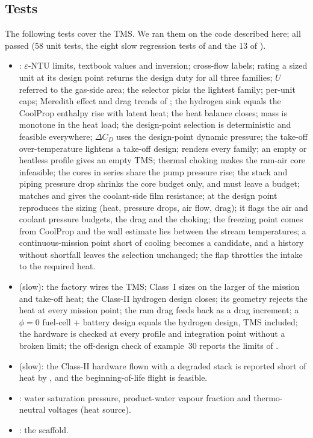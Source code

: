\documentclass[a4paper,11pt]{article}
\begin{document}
\subsection{Tests}
The following tests cover the TMS. We ran them on the code described here; all passed
(58 unit tests, the eight slow regression tests of  and the 13
of ).
\begin{itemize}
\item {}: $\varepsilon$-NTU limits, textbook values
  and inversion; cross-flow labels; rating a sized unit at its design point returns the
  design duty for all three families; $U$ referred to the gas-side area; the selector
  picks the lightest family; per-unit caps; Meredith effect and drag trends of
  ; the hydrogen sink equals the CoolProp enthalpy rise with latent
  heat; the heat balance closes; mass is monotone in the heat load; the design-point
  selection is deterministic and feasible everywhere; $\Delta C_D$ uses the design-point
  dynamic pressure; the take-off over-temperature lightens a take-off design;
   renders every family; an empty or heatless profile gives an empty TMS;
  thermal choking makes the ram-air core infeasible; the cores in series share the pump
  pressure rise; the stack and piping pressure drop shrinks the core budget only, and must
  leave a budget;  matches  and gives the coolant-side
  film resistance;  at the design point reproduces the sizing (heat,
  pressure drops, air flow, drag); it flags the air and coolant pressure budgets, the drag
  and the choking; the freezing point comes from CoolProp and the wall estimate lies between
  the stream temperatures; a continuous-mission point short of cooling becomes a candidate,
  and a history without shortfall leaves the selection unchanged; the flap throttles the
  intake to the required heat.
\item {} (slow): the factory wires the TMS; Class~I
  sizes on the larger of the mission and take-off heat; the Class-II hydrogen design
  closes; its geometry rejects the heat at every mission point; the ram drag feeds back as a
  drag increment; a $\phi = 0$ fuel-cell + battery design equals the hydrogen design, TMS
  included; the hardware is checked at every profile and integration point without a broken
  limit; the off-design check of example~30 reports the limits of .
\item {} (slow): the Class-II hardware flown with a
  degraded stack is reported short of heat by , and the beginning-of-life
  flight is feasible.
\item {}: water saturation pressure, product-water
  vapour fraction and thermo-neutral voltages (heat source).
\item {}: the  scaffold.
\end{itemize}
\end{document}
